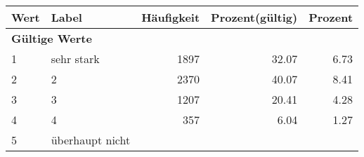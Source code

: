      \begin{longtable}{lXrrr}
     \toprule
     \textbf{Wert} & \textbf{Label} & \textbf{Häufigkeit} & \textbf{Prozent(gültig)} & \textbf{Prozent} \\
     \endhead
     \midrule
     \multicolumn{5}{l}{\textbf{Gültige Werte}}\\

     1 &
     \multicolumn{1}{X}{ sehr stark   } &


       \num{1897} &
       \num[round-mode=places,round-precision=2]{32.07} &
         \num[round-mode=places,round-precision=2]{6.73} \\

     2 &
     \multicolumn{1}{X}{ 2   } &


       \num{2370} &
       \num[round-mode=places,round-precision=2]{40.07} &
         \num[round-mode=places,round-precision=2]{8.41} \\

     3 &
     \multicolumn{1}{X}{ 3   } &


       \num{1207} &
       \num[round-mode=places,round-precision=2]{20.41} &
         \num[round-mode=places,round-precision=2]{4.28} \\

     4 &
     \multicolumn{1}{X}{ 4   } &


       \num{357} &
       \num[round-mode=places,round-precision=2]{6.04} &
         \num[round-mode=places,round-precision=2]{1.27} \\

     5 &
     \multicolumn{1}{X}{ überhaupt nicht   } &



\end{longtable}
